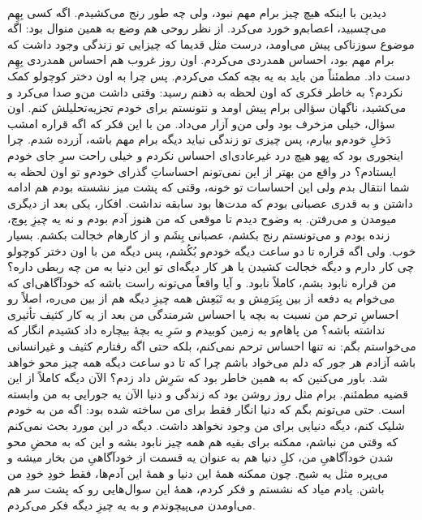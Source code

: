 \documentclass[12pt]{book}
\begin{document}
    \paragraph{}
    دیدین با اینکه هیچ چیز برام مهم نبود، ولی چه طور رنج می‌کشیدم. اگه کسی بِهِم می‌چسبید، اعصابم‌و خورد می‌کرد. از نظر روحی هم وضع به همین منوال بود: اگه موضوع سوزناکی پیش می‌اومد، درست مثل قدیما که چیزایی تو زندگی وجود داشت که برام مهم بود، احساس همدردی می‌کردم. اون روز  غروب هم احساس همدردی بِهِم دست داد. مطمئناً من باید به یه بچه کمک می‌کردم. پس چرا به اون دختر کوچولو کمک نکردم؟ به خاطر فکری که اون لحظه به ذهنم رسید: وقتی داشت من‌و صدا می‌کرد و می‌کشید، ناگهان سؤالی برام پیش اومد و نتونستم برای خودم تجزیه‌تحلیلش کنم. اون سؤال، خیلی مزخرف بود ولی من‌و آزار می‌داد. من با این فکر که اگه قراره امشب دَخلِ خودم‌و بیارم، پس چیزی تو زندگی نباید دیگه برام مهم باشه، آزرده شدم. چرا اینجوری بود که یِهو هیچ درد غیرعادی‌ای احساس نکردم و خیلی راحت سرِ جای خودم ایستادم؟ در واقع من بهتر از این نمی‌تونم احساساتِ گذرای خودم‌و تو اون لحظه به شما انتقال بدم ولی این احساسات تو خونه، وقتی که پشت میز نشسته بودم هم ادامه داشتن و به قدری عصبانی بودم که مدت‌ها بود سابقه نداشت. افکار، یکی بعد از دیگری میومدن و می‌رفتن. به وضوح دیدم تا موقعی که من هنوز آدم بودم و نه یه چیزِ پوچ، زنده بودم و می‌تونستم رنج بکشم، عصبانی بِشَم و از کارهام خجالت بکشم. بسیار خوب. ولی اگه قراره تا دو ساعت دیگه خودم‌و بُکُشم، پس دیگه من با اون دختر کوچولو چی کار دارم و دیگه خجالت کشیدن یا هر کار دیگه‌ای تو این دنیا به من چه ربطی داره؟ من قراره نابود بشم، کاملاً نابود. و آیا واقعاً می‌تونه راست باشه که خودآگاهی‌ای که می‌خوام یه دفعه از بین بِبَرَمِش و به تَبَعِش همه چیزِ دیگه هم از بین می‌ره،  اصلاً رو احساسِ ترحم من نسبت به بچه یا احساس شرمندگی من بعد از یه کار کثیف تأثیری نداشته باشه؟ من پاهام‌و به زمین کوبیدم و سَرِ یه بچهٔ بیچاره داد کشیدم انگار که می‌خواستم بگم: نه تنها احساس ترحم نمی‌کنم، بلکه حتی اگه رفتارم کثیف و غیرانسانی باشه آزادم هر جور که دلم می‌خواد باشم چرا که تا دو ساعت دیگه همه چیز محو خواهد شد. باور می‌کنین که به همین خاطر بود که سَرِش داد زدم؟ الآن دیگه کاملاً از این قضیه مطمئنم. برام مثل روز روشن بود که زندگی و دنیا الآن یه جورایی به من وابسته است. حتی می‌تونم بگم که دنیا انگار فقط برای من ساخته شده بود: اگه من به خودم شلیک کنم، دیگه دنیایی برای من وجود نخواهد داشت. دیگه در این مورد بحث نمی‌کنم که وقتی من نباشم، ممکنه برای بقیه هم همه چیز نابود بشه و این که به محضِ محو شدن خودآگاهیِ من، کلِ دنیا هم به عنوان یه قسمت از خودآگاهیِ من بخار میشه و می‌پره مثل یه شبح. چون ممکنه همهٔ این دنیا و همهٔ این آدم‌ها، فقط خودِ خودِ من باشن. یادم میاد که نشستم و فکر کردم، همهٔ این سوال‌هایی رو که پشت سر هم می‌اومدن می‌پیچوندم و به یه چیزِ دیگه فکر می‌کردم.
\end{document}
